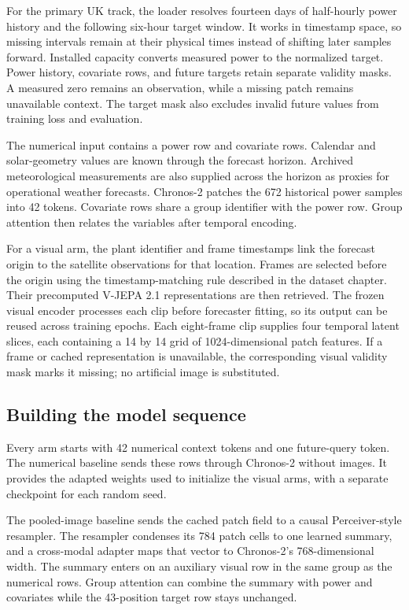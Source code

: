 For the primary UK track, the loader resolves fourteen days of half-hourly power history and the following six-hour target window. It works in timestamp space, so missing intervals remain at their physical times instead of shifting later samples forward. Installed capacity converts measured power to the normalized target. Power history, covariate rows, and future targets retain separate validity masks. A measured zero remains an observation, while a missing patch remains unavailable context. The target mask also excludes invalid future values from training loss and evaluation.

The numerical input contains a power row and covariate rows. Calendar and solar-geometry values are known through the forecast horizon. Archived meteorological measurements are also supplied across the horizon as proxies for operational weather forecasts. Chronos-2 patches the 672 historical power samples into 42 tokens. Covariate rows share a group identifier with the power row. Group attention then relates the variables after temporal encoding.

For a visual arm, the plant identifier and frame timestamps link the forecast origin to the satellite observations for that location. Frames are selected before the origin using the timestamp-matching rule described in the dataset chapter. Their precomputed V-JEPA 2.1 representations are then retrieved. The frozen visual encoder processes each clip before forecaster fitting, so its output can be reused across training epochs. Each eight-frame clip supplies four temporal latent slices, each containing a 14 by 14 grid of 1024-dimensional patch features. If a frame or cached representation is unavailable, the corresponding visual validity mask marks it missing; no artificial image is substituted.

\subsection{Building the model sequence}

Every arm starts with 42 numerical context tokens and one future-query token. The numerical baseline sends these rows through Chronos-2 without images. It provides the adapted weights used to initialize the visual arms, with a separate checkpoint for each random seed.

The pooled-image baseline sends the cached patch field to a causal Perceiver-style resampler. The resampler condenses its 784 patch cells to one learned summary, and a cross-modal adapter maps that vector to Chronos-2's 768-dimensional width. The summary enters on an auxiliary visual row in the same group as the numerical rows. Group attention can combine the summary with power and covariates while the 43-position target row stays unchanged.

